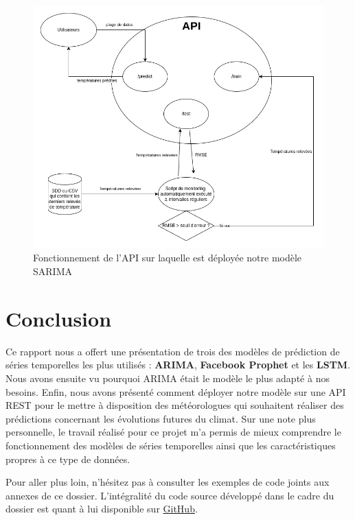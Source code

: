 \documentclass[french]{article}
\begin{document}
    \begin{figure}[h]
        \includegraphics[width=12cm]{schema_API_E2}
        \centering
        \caption{Fonctionnement de l'API sur laquelle est déployée notre modèle SARIMA}
        \centering
    \end{figure}

    \newpage
    \section*{Conclusion}
    Ce rapport nous a offert une présentation de trois des modèles de prédiction de séries temporelles les plus utilisés : \textbf{ARIMA}, \textbf{Facebook Prophet} et les \textbf{LSTM}. Nous avons ensuite vu pourquoi ARIMA était le modèle le plus adapté à nos besoins. Enfin, nous avons présenté comment déployer notre modèle sur une API REST pour le mettre à disposition des météorologues qui souhaitent réaliser des prédictions concernant les évolutions futures du climat.
    Sur une note plus personnelle, le travail réalisé pour ce projet m'a permis de mieux comprendre le fonctionnement des modèles de séries temporelles ainsi que les caractéristiques propres à ce type de données.

    Pour aller plus loin, n'hésitez pas à consulter les exemples de code joints aux annexes de ce dossier. L'intégralité du code source développé dans le cadre du dossier est quant à lui disponible sur \href{https://github.com/vinpap/predict_climate_change}{GitHub}.

\end{document}
